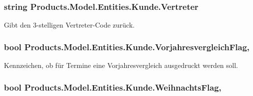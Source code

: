 \subsubsection[{\texorpdfstring{Vertreter}{Vertreter}}]{\setlength{\rightskip}{0pt plus 5cm}string Products.\+Model.\+Entities.\+Kunde.\+Vertreter\hspace{0.3cm}{\ttfamily [get]}}\hypertarget{class_products_1_1_model_1_1_entities_1_1_kunde_a97934cbc4bad187523cd4d94d199f659}{}\label{class_products_1_1_model_1_1_entities_1_1_kunde_a97934cbc4bad187523cd4d94d199f659}


Gibt den 3-\/stelligen Vertreter-\/\+Code zurück. 

\subsubsection[{\texorpdfstring{Vorjahresvergleich\+Flag}{VorjahresvergleichFlag}}]{\setlength{\rightskip}{0pt plus 5cm}bool Products.\+Model.\+Entities.\+Kunde.\+Vorjahresvergleich\+Flag\hspace{0.3cm}{\ttfamily [get]}, {\ttfamily [set]}}\hypertarget{class_products_1_1_model_1_1_entities_1_1_kunde_a08446c7a95cf7913366a586873722f62}{}\label{class_products_1_1_model_1_1_entities_1_1_kunde_a08446c7a95cf7913366a586873722f62}


Kennzeichen, ob für Termine eine Vorjahresvergleich ausgedruckt werden soll. 

\subsubsection[{\texorpdfstring{Weihnachts\+Flag}{WeihnachtsFlag}}]{\setlength{\rightskip}{0pt plus 5cm}bool Products.\+Model.\+Entities.\+Kunde.\+Weihnachts\+Flag\hspace{0.3cm}{\ttfamily [get]}, {\ttfamily [set]}}\hypertarget{class_products_1_1_model_1_1_entities_1_1_kunde_a86514421c1d2101e3cc443884ce17f7f}{}\label{class_products_1_1_model_1_1_entities_1_1_kunde_a86514421c1d2101e3cc443884ce17f7f}


